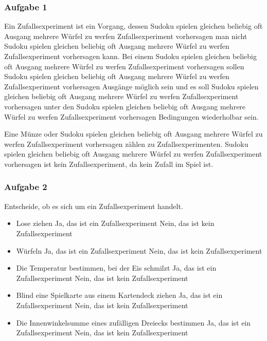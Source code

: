 \documentclass[
  ngerman,
]{book}
\begin{document}
\hypertarget{aufgabe-1-5}{%
\subsubsection*{Aufgabe 1}\label{aufgabe-1-5}}

Ein Zufallsexperiment ist ein Vorgang, dessen Sudoku spielen gleichen beliebig oft Ausgang mehrere Würfel zu werfen Zufallsexperiment vorhersagen man nicht Sudoku spielen gleichen beliebig oft Ausgang mehrere Würfel zu werfen Zufallsexperiment vorhersagen kann. Bei einem Sudoku spielen gleichen beliebig oft Ausgang mehrere Würfel zu werfen Zufallsexperiment vorhersagen sollen Sudoku spielen gleichen beliebig oft Ausgang mehrere Würfel zu werfen Zufallsexperiment vorhersagen Ausgänge möglich sein und es soll Sudoku spielen gleichen beliebig oft Ausgang mehrere Würfel zu werfen Zufallsexperiment vorhersagen unter den Sudoku spielen gleichen beliebig oft Ausgang mehrere Würfel zu werfen Zufallsexperiment vorhersagen Bedingungen wiederholbar sein.

Eine Münze oder Sudoku spielen gleichen beliebig oft Ausgang mehrere Würfel zu werfen Zufallsexperiment vorhersagen zählen zu Zufallsexperimenten. Sudoku spielen gleichen beliebig oft Ausgang mehrere Würfel zu werfen Zufallsexperiment vorhersagen ist kein Zufallsexperiment, da kein Zufall im Spiel ist.

\hypertarget{section-40}{%
\subsubsection*{}\label{section-40}}

\hypertarget{aufgabe-2-5}{%
\subsubsection*{Aufgabe 2}\label{aufgabe-2-5}}

Entscheide, ob es sich um ein Zufallsexperiment handelt.

\begin{itemize}
\item
  Lose ziehen Ja, das ist ein Zufallsexperiment Nein, das ist kein Zufallsexperiment
\item
  Würfeln Ja, das ist ein Zufallsexperiment Nein, das ist kein Zufallsexperiment
\item
  Die Temperatur bestimmen, bei der Eis schmilzt Ja, das ist ein Zufallsexperiment Nein, das ist kein Zufallsexperiment
\item
  Blind eine Spielkarte aus einem Kartendeck ziehen Ja, das ist ein Zufallsexperiment Nein, das ist kein Zufallsexperiment
\item
  Die Innenwinkelsumme eines zufälligen Dreiecks bestimmen Ja, das ist ein Zufallsexperiment Nein, das ist kein Zufallsexperiment
\end{itemize}
\end{document}
